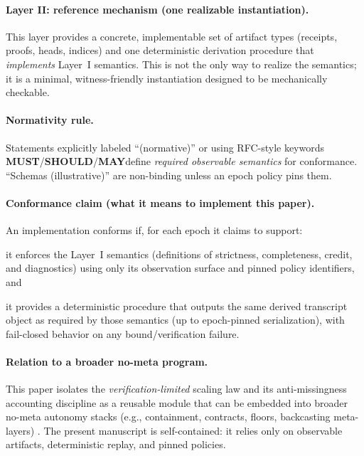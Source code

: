\documentclass[11pt]{article}
\newcommand{\MUST}{\textbf{MUST}}
\newcommand{\SHOULD}{\textbf{SHOULD}}
\newcommand{\MAY}{\textbf{MAY}}
\newcommand{\1}{\mathbf{1}}
\theoremstyle{definition}
\theoremstyle{plain}
\begin{document}
\paragraph{Layer II: reference mechanism (one realizable instantiation).}
This layer provides a concrete, implementable set of artifact types (receipts, proofs, heads, indices) and one deterministic derivation procedure that \emph{implements} Layer~I semantics. This is not the only way to realize the semantics; it is a minimal, witness-friendly instantiation designed to be mechanically checkable.

\paragraph{Normativity rule.}
Statements explicitly labeled ``(normative)'' or using RFC-style keywords \MUST/\SHOULD/\MAY define \emph{required observable semantics} for conformance. ``Schemas (illustrative)'' are non-binding unless an epoch policy pins them.

\paragraph{Conformance claim (what it means to implement this paper).}
An implementation conforms if, for each epoch it claims to support:
\begin{tightitemize}
\item it enforces the Layer~I semantics (definitions of strictness, completeness, credit, and diagnostics) using only its observation surface and pinned policy identifiers, and
\item it provides a deterministic procedure that outputs the same derived transcript object as required by those semantics (up to epoch-pinned serialization), with fail-closed behavior on any bound/verification failure.
\end{tightitemize}

\paragraph{Relation to a broader no-meta program.}
This paper isolates the \emph{verification-limited} scaling law and its anti-missingness accounting discipline as a reusable module that can be embedded into broader no-meta autonomy stacks (e.g., containment, contracts, floors, backcasting meta-layers) \cite{TakahashiAPWJ2026,TakahashiONCAP2026,TakahashiContracts2026,TakahashiFloors2026,TakahashiPOBML2026}. The present manuscript is self-contained: it relies only on observable artifacts, deterministic replay, and pinned policies.
\end{document}
